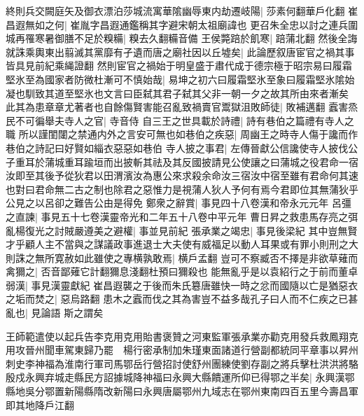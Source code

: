 終則兵交闕庭矢及御衣漂泊莎城流寓華隂幽辱東内劫遷岐陽|{
	莎素何翻華戶化翻}
崔昌遐無如之何|{
	崔胤字昌遐通鑑稱其字避宋朝太祖廟諱也}
更召朱全忠以討之連兵圍城再罹寒暑御膳不足於糗糒|{
	糗去久翻糒音備}
王侯斃踣於飢寒|{
	踣蒲北翻}
然後全誨就誅乘輿東出翦滅其黨靡有孑遺而唐之廟社因以丘墟矣|{
	此論歷叙唐宦官之禍其事皆具見前紀乘䋲證翻}
然則宦官之禍始于明皇盛于肅代成于德宗極于昭宗易曰履霜堅氷至為國家者防微杜漸可不慎始哉|{
	易坤之初六曰履霜堅氷至象曰履霜堅氷隂始凝也馴致其道至堅氷也文言曰臣弑其君子弑其父非一朝一夕之故其所由來者漸矣}
此其為患章章尤著者也自餘傷賢害能召亂致禍賣官鬻獄沮敗師徒|{
	敗補邁翻}
蠧害烝民不可徧舉夫寺人之官|{
	寺音侍}
自三王之世具載於詩禮|{
	詩有巷伯之篇禮有寺人之職}
所以謹閨闥之禁通内外之言安可無也如巷伯之疾惡|{
	周幽王之時寺人傷于讒而作巷伯之詩記曰好賢如緇衣惡惡如巷伯}
寺人披之事君|{
	左傳晉獻公信讒使寺人披伐公子重耳於蒲城重耳踰垣而出披斬其祛及其反國披請見公使讓之曰蒲城之役君命一宿汝即至其後予從狄君以田渭濱汝為惠公來求殺余命汝三宿汝中宿至雖有君命何其速也對曰君命無二古之制也除君之惡惟力是視蒲人狄人予何有焉今君即位其無蒲狄乎公見之以呂卻之難告公由是得免}
鄭衆之辭賞|{
	事見四十八卷漢和帝永元元年}
呂彊之直諫|{
	事見五十七卷漢靈帝光和二年五十八卷中平元年}
曹日昇之救患馬存亮之弭亂楊復光之討賊嚴遵美之避權|{
	事並見前紀}
張承業之竭忠|{
	事見後梁紀}
其中豈無賢才乎顧人主不當與之謀議政事進退士大夫使有威福足以動人耳果或有罪小則刑之大則誅之無所寛赦如此雖使之專横孰敢焉|{
	横戶孟翻}
豈可不察臧否不擇是非欲草薙而禽獮之|{
	否音鄙薙它計翻獮息淺翻杜預曰獮殺也}
能無亂乎是以袁紹行之于前而董卓弱漢|{
	事見漢靈獻紀}
崔昌遐襲之于後而朱氏簒唐雖快一時之忿而國隨以亡是猶惡衣之垢而焚之|{
	惡烏路翻}
患木之蠧而伐之其為害豈不益多哉孔子曰人而不仁疾之已甚亂也|{
	見論語}
斯之謂矣

王師範遣使以起兵告李克用克用貽書褒贊之河東監軍張承業亦勸克用發兵救鳳翔克用攻晉州聞車駕東歸乃罷　楊行密承制加朱瑾東面諸道行營副都統同平章事以昇州刺史李神福為淮南行軍司馬鄂岳行營招討使舒州團練使劉存副之將兵擊杜洪洪將駱殷戍永興弃城走縣民方詔據城降神福曰永興大縣饋運所仰已得鄂之半矣|{
	永興漢鄂縣地吳分鄂置新陽縣隋改新陽曰永興唐屬鄂州九域志在鄂州東南四百五里今壽昌軍即其地降戶江翻}


